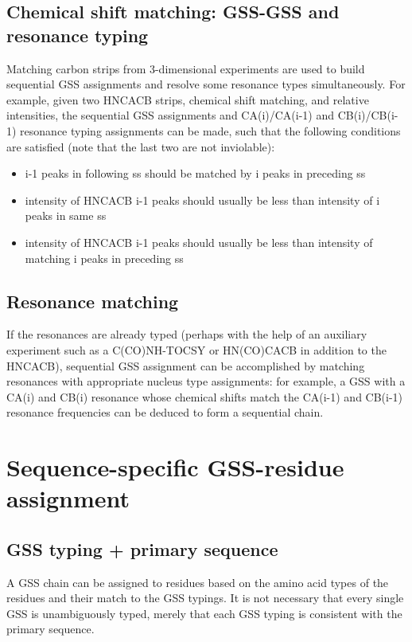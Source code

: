 \subsection*{Chemical shift matching: GSS-GSS and resonance typing}
\label{subsec_shift_matching_seq_gss}
Matching carbon strips from 3-dimensional experiments are used to build 
sequential GSS assignments and resolve some resonance types simultaneously. 
For example, given two HNCACB strips, chemical shift matching, and relative 
intensities, the sequential GSS assignments and CA(i)/CA(i-1) and CB(i)/CB(i-1) 
resonance typing assignments can be made, such that the following conditions
are satisfied (note that the last two are not inviolable):
\begin{itemize}
  \item i-1 peaks in following ss should be matched by i peaks in preceding ss
  \item intensity of HNCACB i-1 peaks should usually be less than intensity of i peaks in same ss
  \item intensity of HNCACB i-1 peaks should usually be less than intensity of matching i peaks in preceding ss
\end{itemize}

\subsection*{Resonance matching}
If the resonances are already typed (perhaps with the help of an auxiliary
experiment such as a C(CO)NH-TOCSY or HN(CO)CACB in addition to the HNCACB), 
sequential GSS assignment can be accomplished by matching resonances with
appropriate nucleus type assignments: for example, a GSS with a CA(i) and CB(i)
resonance whose chemical shifts match the CA(i-1) and CB(i-1) resonance
frequencies can be deduced to form a sequential chain.



\section*{Sequence-specific GSS-residue assignment}

\subsection*{GSS typing + primary sequence}
A GSS chain can be assigned to residues based on the amino acid types of the 
residues and their match to the GSS typings.  It is not necessary that every
single GSS is unambiguously typed, merely that each GSS typing is consistent
with the primary sequence.


